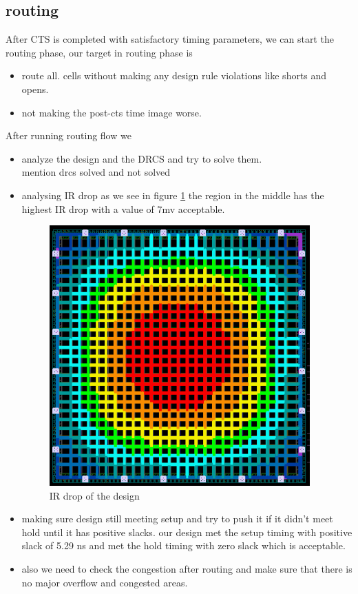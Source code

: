\documentclass[../main.tex]{subfiles}
\begin{document}
 \subsection{routing}
After CTS is completed with satisfactory timing parameters, we can start the routing phase,
our target in routing phase is
\begin{itemize}
    \item route all. cells without making any design rule violations like shorts and opens.
    \item not making the post-cts time image worse.
\end{itemize}

\newpage 
After running routing flow we 
\begin{itemize}
    \item analyze the design and the DRCS and try to solve them.\\
    mention drcs solved and not solved 
    \item analysing IR drop as we see in figure \ref{fig:irdrop} the region in the middle has the highest IR drop with a value of 7mv acceptable. 
    \begin{figure}[h!]
    \centering
    \includegraphics[width=10cm]{diagrams/irdrop.png}
    \caption{IR drop of the design}
    \label{fig:irdrop}
\end{figure}
    \item making sure design still meeting setup and try to push it if it didn't meet hold until it has positive slacks.
    our design met the setup timing with positive slack of 5.29 ns and met the hold timing with zero slack which is acceptable.
    \item also we need to check the congestion after routing and make sure that there is no major overflow and congested areas.
\end{itemize}
\end{document}

